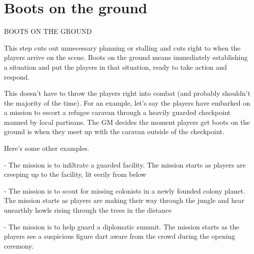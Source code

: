 \chapter{Boots on the ground}
                                  BOOTS ON THE GROUND


This step cuts out unnecessary planning or stalling and cuts right to when the players arrive on
the scene. Boots on the ground means immediately establishing a situation and put the players
in that situation, ready to take action and respond.


This doesn’t have to throw the players right into combat (and probably shouldn’t the majority of
the time). For an example, let’s say the players have embarked on a mission to escort a refugee
caravan through a heavily guarded checkpoint manned by local partisans. The GM decides the
moment players get boots on the ground is when they meet up with the caravan outside of the
checkpoint.


Here’s some other examples.

         	- The mission is to infiltrate a guarded facility. The mission starts as players are creeping
         up to the facility, lit eerily from below

         	- The mission is to scout for missing colonists in a newly founded colony planet. The
         mission starts as players are making their way through the jungle and hear unearthly
         howls rising through the trees in the distance

         	- The mission is to help guard a diplomatic summit. The mission starts as the players see
         a suspicious figure dart aware from the crowd during the opening ceremony.
